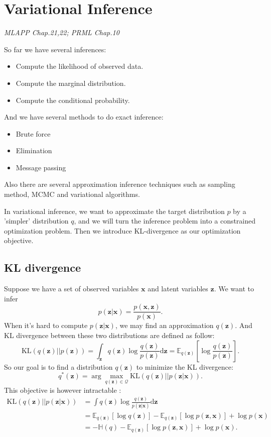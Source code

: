 \documentclass{article}
\newcommand{\mrm}{\mathrm}
\newcommand{\mbf}{\mathbf}
\newcommand{\mcal}{\mathcal}
\newcommand{\xx}{\mbf x}
\newcommand{\zz}{\mbf z}
\newcommand{\Exp}{\mathbb{E}}
\begin{document}
\section{Variational Inference}
\emph{MLAPP Chap.21,22; PRML Chap.10}

So far we have several inferences: 
\begin{itemize}
    \item Compute the likelihood of observed data.
    \item Compute the marginal distribution.
    \item Compute the conditional probability.
\end{itemize}
And we have several methods to do exact inference:
\begin{itemize}
    \item Brute force
    \item Elimination
    \item Message passing
\end{itemize}
Also there are several approximation inference techniques such as sampling method, MCMC and variational algorithms.

In variational inference, we want to approximate the target distribution $p$ by a 'simpler' distribution $q$, and we will turn the inference problem into a constrained optimization problem. Then we introduce KL-divergence as our optimization objective. 

\subsection{KL divergence}
Suppose we have a set of observed variables $\xx$ and latent variables $\zz$. We want to infer 
\begin{equation}
    p(\zz|\xx) = \frac{p(\xx,\zz)}{p(\xx)}.
\end{equation}
When it's hard to compute $p(\zz|\xx)$, we may find an approximation $q(\zz)$. And KL divergence between these two distributions are defined as follow:
\begin{equation}
    \mrm{KL}(q(\zz)||p(\zz)) = \int_{\zz}q(\zz)\log \frac{q(\zz)}{p(\zz)}\mrm d\zz = \Exp_{q(\zz)}[\log \frac{q(\zz)}{p(\zz)}].
\end{equation}
So our goal is to find a distribution $q(\zz)$ to minimize the KL divergence:
\begin{equation}\label{eq10.1}
    q^*(\zz) = \arg\max_{q(\zz)\in \mcal Q}\mrm{KL}(q(\zz)||p(\zz|\xx)).
\end{equation}
This objective is however intractable :
\begin{align}
    \mrm{KL}(q(\zz)||p(\zz|\xx)) & = \int q(\zz)\log\frac{q(\zz)}{p(\zz|\xx)}\mrm d\zz \\
    & =\Exp_{q(\zz)}[\log q(\zz)]-\Exp_{q(\zz)}[\log p(\zz,\xx)]+\log p(\xx) \\
    & = -\mathbb H(q)- \Exp_{q(\zz)}[\log p(\zz,\xx)] +\log p(\xx).
\end{align}
\end{document}
